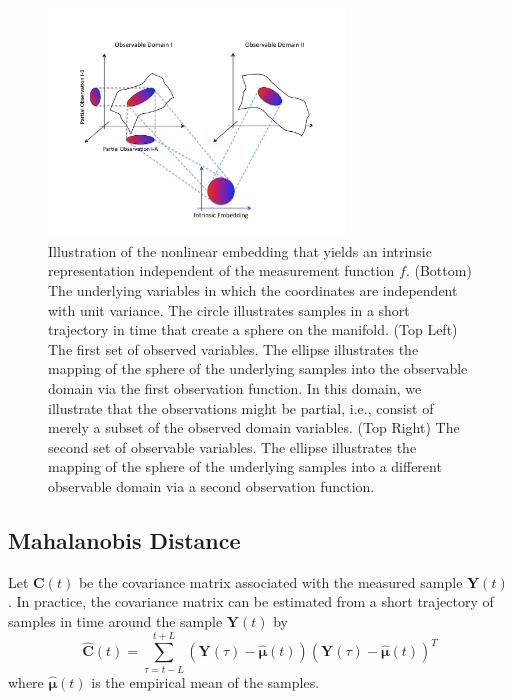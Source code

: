 \documentclass[aip,jcp,preprint]{revtex4-1}
\begin{document}
\begin{figure}[ht]
\includegraphics[width=0.7\textwidth]{IntrinsicEmbeddingIllustration2}
\caption{Illustration of the nonlinear embedding that yields an intrinsic representation independent of the measurement function $f$. (Bottom) The underlying variables in which the coordinates are independent with unit variance. The circle illustrates samples in a short trajectory in time that create a sphere on the manifold. (Top Left) The first set of observed variables. The ellipse illustrates the mapping of the sphere of the underlying samples into the observable domain via the first observation function. In this domain, we illustrate that the observations might be partial, i.e., consist of merely a subset of the observed domain variables. (Top Right) The second set of observable variables. The ellipse illustrates the mapping of the sphere of the underlying samples into a different observable domain via a second observation function.}
\label{fig:IntrinsicIllustration}
\end{figure}

\subsection{Mahalanobis Distance}
\label{subsec:mahalanobis}

Let $\mathbf{C}(t)$ be the covariance matrix associated with the measured sample $\mathbf{Y}(t)$. In practice, the covariance matrix can be estimated from a short trajectory of samples in time around the sample $\mathbf{Y}(t)$ by
\begin{equation}
	\widehat{\mathbf{C}}(t) = \sum \limits _{\tau = t-L}^{t+L} (\mathbf{Y}(\tau) - \widehat{\boldsymbol{\mu}}(t))(\mathbf{Y}(\tau) - \widehat{\boldsymbol{\mu}}(t))^T
	\label{eq:cov}
\end{equation}
where $\widehat{\boldsymbol{\mu}}(t)$ is the empirical mean of the samples.
\end{document}
